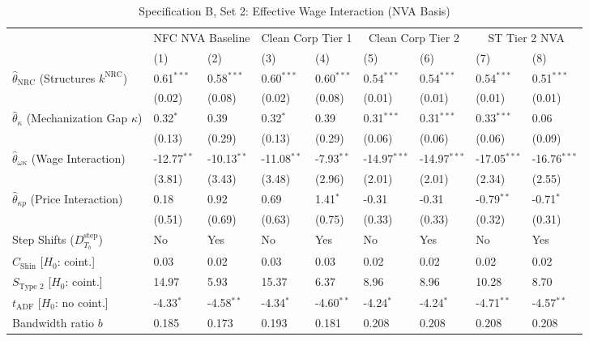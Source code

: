 \begin{table}[h!]
\centering
\caption{Specification B, Set 2: Effective Wage Interaction (NVA Basis)}
\label{tab:specB_set2_nva_main}
\small
\begin{tabular}{p{3.0cm}p{1.25cm}p{1.25cm}p{1.25cm}p{1.25cm}p{1.5cm}p{1.5cm}p{1.5cm}p{1.5cm}}
\toprule
 & \multicolumn{2}{c}{NFC NVA Baseline} & \multicolumn{2}{c}{Clean Corp Tier 1} & \multicolumn{2}{c}{Clean Corp Tier 2} & \multicolumn{2}{c}{ST Tier 2 NVA} \\
\cmidrule(lr){2-3} \cmidrule(lr){4-5} \cmidrule(lr){6-7} \cmidrule(lr){8-9}
 & (1) & (2) & (3) & (4) & (5) & (6) & (7) & (8) \\
\midrule
$\hat{\theta}_{\text{NRC}}$ (Structures $k^{\text{NRC}}$) & 0.61$^{***}$ & 0.58$^{***}$ & 0.60$^{***}$ & 0.60$^{***}$ & 0.54$^{***}$ & 0.54$^{***}$ & 0.54$^{***}$ & 0.51$^{***}$ \\
 & (0.02) & (0.08) & (0.02) & (0.08) & (0.01) & (0.01) & (0.01) & (0.01) \\
$\hat{\theta}_{\kappa}$ (Mechanization Gap $\kappa$) & 0.32$^{*}$ & 0.39 & 0.32$^{*}$ & 0.39 & 0.31$^{***}$ & 0.31$^{***}$ & 0.33$^{***}$ & 0.06 \\
 & (0.13) & (0.29) & (0.13) & (0.29) & (0.06) & (0.06) & (0.06) & (0.09) \\
$\hat{\theta}_{\omega\kappa}$ (Wage Interaction) & -12.77$^{**}$ & -10.13$^{**}$ & -11.08$^{**}$ & -7.93$^{**}$ & -14.97$^{***}$ & -14.97$^{***}$ & -17.05$^{***}$ & -16.76$^{***}$ \\
 & (3.81) & (3.43) & (3.48) & (2.96) & (2.01) & (2.01) & (2.34) & (2.55) \\
$\hat{\theta}_{\kappa p}$ (Price Interaction) & 0.18 & 0.92 & 0.69 & 1.41$^{*}$ & -0.31 & -0.31 & -0.79$^{**}$ & -0.71$^{*}$ \\
 & (0.51) & (0.69) & (0.63) & (0.75) & (0.33) & (0.33) & (0.32) & (0.31) \\
\midrule
Step Shifts ($D_{T_b}^{\text{step}}$) & No & Yes & No & Yes & No & Yes & No & Yes \\
$C_{\text{Shin}}$ [$H_0$: coint.] & 0.03 & 0.02 & 0.03 & 0.03 & 0.02 & 0.02 & 0.02 & 0.02 \\
$S_{\text{Type 2}}$ [$H_0$: coint.] & 14.97 & 5.93 & 15.37 & 6.37 & 8.96 & 8.96 & 10.28 & 8.70 \\
$t_{\text{ADF}}$ [$H_0$: no coint.] & -4.33$^{*}$ & -4.58$^{**}$ & -4.34$^{*}$ & -4.60$^{**}$ & -4.24$^{*}$ & -4.24$^{*}$ & -4.71$^{**}$ & -4.57$^{**}$ \\
Bandwidth ratio $b$ & 0.185 & 0.173 & 0.193 & 0.181 & 0.208 & 0.208 & 0.208 & 0.208 \\

\end{tabular}
\end{table}

